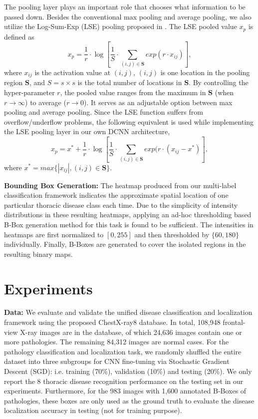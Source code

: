 \documentclass[10pt,twocolumn,letterpaper]{article}
\begin{document}
The pooling layer plays an important role that chooses what information to be passed down. Besides the conventional max pooling and average pooling, we also utilize the Log-Sum-Exp (LSE) pooling proposed in \cite{pinheiro2015image}. The LSE pooled value $x_{p}$ is defined as 
\begin{equation}
x_{p} = \frac{1}{r} \cdot \log \left[\frac{1}{S}\cdot\sum_{(i,j)\in \textbf{S}}exp(r\cdot x_{ij})\right],
\label{eq:LSE}
\end{equation}
where $x_{ij}$ is the activation value at $(i,j)$, $(i,j)$ is one location in the pooling region $\textbf{S}$, and $S = s\times s$ is the total number of locations in $\textbf{S}$. By controlling the hyper-parameter $r$, the pooled value ranges from the maximum in $\textbf{S}$ (when $r \rightarrow \infty$) to average ($r \rightarrow 0$). It serves as an adjustable option between max pooling and average pooling. Since the LSE function suffers from overflow/underflow problems, the following equivalent is used while implementing the LSE pooling layer in our own DCNN architecture, 
\begin{equation}
x_{p} = x^{*} + \frac{1}{r} \cdot \log \left[\frac{1}{S}\cdot\sum_{(i,j)\in \textbf{S}}exp(r\cdot (x_{ij}-x^{*})\right],
\label{eq:LSE-imp}
\end{equation}
where $x^{*}=max\{|x_{ij}|,(i,j)\in \textbf{S}\}$.

{\bf Bounding Box Generation:}
The heatmap produced from our multi-label classification framework indicates the approximate spatial location of one particular thoracic disease class each time. Due to the simplicity of intensity distributions in these resulting heatmaps, applying an ad-hoc thresholding based B-Box generation method for this task is found to be sufficient. The intensities in heatmaps are first normalized to $[0,255]$ and then thresholded by $\{60, 180\}$ individually. Finally, B-Boxes are generated to cover the isolated regions in the resulting binary maps. 

\section{Experiments}

{\bf Data:} We evaluate and validate the unified disease classification and localization framework using the proposed ChestX-ray8 database. In total, 108,948 frontal-view X-ray images are in the database, of which 24,636 images contain one or more pathologies. The remaining 84,312 images are normal cases. For the pathology classification and localization task, we randomly shuffled the entire dataset into three subgroups for CNN fine-tuning via Stochastic Gradient Descent (SGD): i.e. training (70\%), validation (10\%) and testing (20\%). We only report the 8 thoracic disease recognition performance on the testing set in our experiments. Furthermore, for the 983 images with 1,600 annotated B-Boxes of pathologies, these boxes are only used as the ground truth to evaluate the disease localization accuracy in testing (not for training purpose).  
\end{document}
